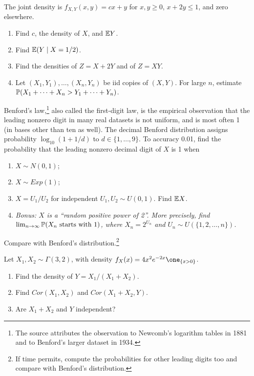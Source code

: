 \documentclass[a4paper]{report}
\begin{document}
\begin{problempencil}
The joint density is $f_{X,Y}(x,y)=cx+y$ for $x,y\ge0$, $x+2y\le1$, and zero elsewhere.
\begin{enumerate}
\item Find $c$, the density of $X$, and $\E Y$.
\item Find $\E(Y\mid X=1/2)$.
\item Find the densities of $Z=X+2Y$ and of $Z=XY$.
\item Let $(X_1,Y_1),\dots,(X_n,Y_n)$ be iid copies of $(X,Y)$. For large $n$, estimate $\P(X_1+\cdots+X_n>Y_1+\cdots+Y_n)$.
\end{enumerate}
\end{problempencil}
\begin{problempencil}
Benford's law,\footnote{The source attributes the observation to Newcomb's logarithm tables in 1881 and to Benford's larger dataset in 1934.} also called the first-digit law, is the empirical observation that the leading nonzero digit in many real datasets is not uniform, and is most often 1 (in bases other than ten as well). The decimal Benford distribution assigns probability $\log_{10}(1+1/d)$ to $d\in\{1,\dots,9\}$. To accuracy 0.01, find the probability that the leading nonzero decimal digit of $X$ is 1 when
\begin{enumerate}
\item $X\sim N(0,1)$;
\item $X\sim Exp(1)$;
\item $X=U_1/U_2$ for independent $U_1,U_2\sim U(0,1)$. Find $\E X$.
\item \textit{Bonus: $X$ is a ``random positive power of 2''. More precisely, find $\lim_{n\to\infty}\P(X_n\text{ starts with 1})$, where $X_n=2^{U_n}$ and $U_n\sim U(\{1,2,\dots,n\})$.}
\end{enumerate}
Compare with Benford's distribution.\footnote{If time permits, compute the probabilities for other leading digits too and compare with Benford's distribution.}
\end{problempencil}
\begin{problempencil}
Let $X_1,X_2\sim\Gamma(3,2)$, with density $f_X(x)=4x^2e^{-2x}\one_{\{x>0\}}$.
\begin{enumerate}
\item Find the density of $Y=X_1/(X_1+X_2)$.
\item Find $Cor(X_1,X_2)$ and $Cor(X_1+X_2,Y)$.
\item Are $X_1+X_2$ and $Y$ independent?
\end{enumerate}
\end{problempencil}
\end{document}
